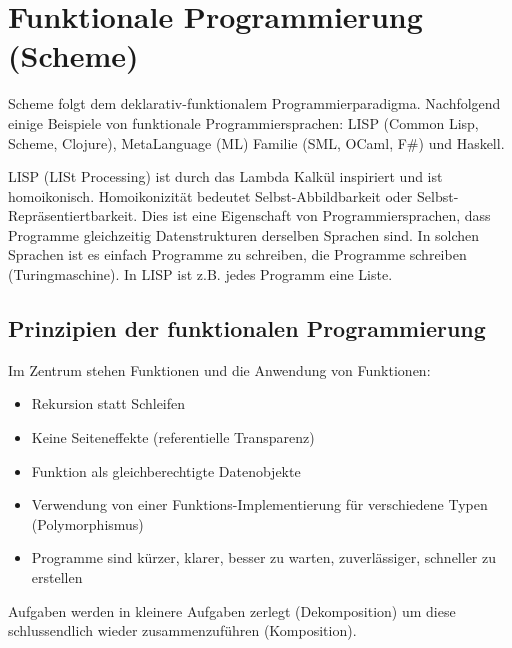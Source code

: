 \chapter{Funktionale Programmierung (Scheme)}
Scheme folgt dem deklarativ-funktionalem Programmierparadigma. Nachfolgend einige Beispiele von funktionale Programmiersprachen: LISP (Common Lisp, Scheme, Clojure), MetaLanguage (ML) Familie (SML, OCaml, F\#) und Haskell.

LISP (LISt Processing) ist durch das Lambda Kalkül inspiriert und ist homoikonisch. Homoikonizität bedeutet Selbst-Abbildbarkeit oder Selbst-Repräsentiertbarkeit. Dies ist eine Eigenschaft von Programmiersprachen, dass Programme gleichzeitig Datenstrukturen derselben Sprachen sind. In solchen Sprachen ist es einfach Programme zu schreiben, die Programme schreiben (Turingmaschine). In LISP ist z.B. jedes Programm eine Liste.

\section{Prinzipien der funktionalen Programmierung}
Im Zentrum stehen Funktionen und die Anwendung von Funktionen:
\begin{itemize}
	\item Rekursion statt Schleifen
	\item Keine Seiteneffekte (referentielle Transparenz)
	\item Funktion als gleichberechtigte Datenobjekte
	\item Verwendung von einer Funktions-Implementierung für verschiedene Typen (Polymorphismus)
	\item Programme sind kürzer, klarer, besser zu warten, zuverlässiger, schneller zu erstellen
\end{itemize}
Aufgaben werden in kleinere Aufgaben zerlegt (Dekomposition) um diese schlussendlich wieder zusammenzuführen (Komposition).

